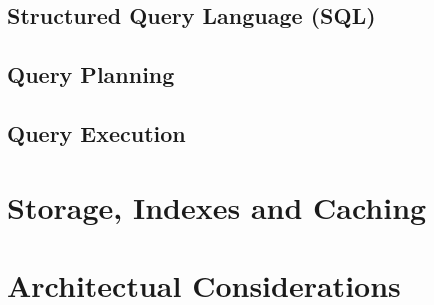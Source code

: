 \subsection{Structured Query Language (SQL)}

\subsection{Query Planning}

\subsection{Query Execution}

\section{Storage, Indexes and Caching}

\section{Architectual Considerations}